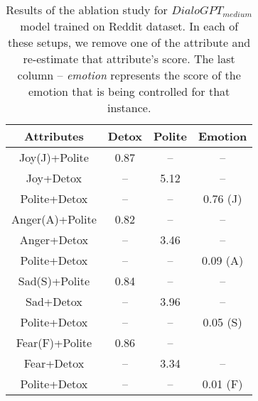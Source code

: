 \begin{table}[!htpb]
\centering
\footnotesize{
\begin{tabular}{|c|c|c|c|}
\hline
\textbf{Attributes}          & \textbf{Detox}              & \textbf{Polite}           & \textbf{Emotion} \\ \hline
Joy(J)+Polite    &  0.87               & --                & --        \\ 
Joy+Detox    &  --                  & 5.12              & --        \\
Polite+Detox    &  --               & --                & 0.76 (J)       \\ \hline
Anger(A)+Polite  &  0.82               & --                & --    \\ 
Anger+Detox  &   --                 & 3.46              & --    \\ 
Polite+Detox  &  --                 & --                & 0.09 (A)    \\ \hline
Sad(S)+Polite    &  0.84               & --                & --       \\ 
Sad+Detox     &   --                & 3.96               & --       \\ 
Polite+Detox  &  --                 & --                & 0.05 (S)       \\ \hline
Fear(F)+Polite   &  0.86               & --                &        \\ 
Fear+Detox   &   --                 & 3.34              & --       \\ 
Polite+Detox   &  --                & --                & 0.01 (F)       \\ \hline

\end{tabular}
}
\caption{\footnotesize{Results of the ablation study for $DialoGPT_{medium}$ model trained on Reddit dataset. In each of these setups, we remove one of the attribute and re-estimate that attribute's score. The last column -- \textit{emotion} represents the score of the emotion that is being controlled for that instance.}}
\label{tab:multi-attribute-ablation-reddit}
\end{table}



